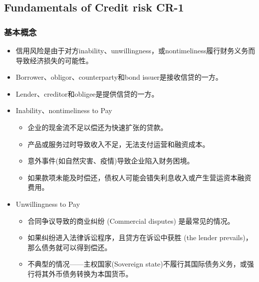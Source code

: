 


\subsection{Fundamentals of Credit risk CR-1}

\subsubsection{基本概念}
\begin{itemize}
\item 信用风险是由于对方inability、unwillingness，或nontimeliness履行财务义务而导致经济损失的可能性。
\item Borrower、obligor、counterparty和bond issuer是接收信贷的一方。
\item Lender、creditor和obligee是提供信贷的一方。
\item Inability、nontimeliness to Pay
    \begin{itemize}
        \item 企业的现金流不足以偿还为快速扩张的贷款。 
        \item 产品或服务过时导致收入不足，无法支付运营和融资成本。
        \item 意外事件(如自然灾害、疫情)导致企业陷入财务困境。
        \item 如果款项未能及时偿还，债权人可能会错失利息收入或产生营运资本融资费用。
    \end{itemize}
\item Unwillingness to Pay
    \begin{itemize}
    \item 合同争议导致的商业纠纷 (Commercial disputes) 是最常见的情况。
    \item 如果纠纷进入法律诉讼程序，且贷方在诉讼中获胜 (the lender prevails)，那么债务就可以得到偿还。
    \item 不典型的情况——主权国家(Sovereign state)不履行其国际债务义务，或强行将其外币债务转换为本国货币。
    \end{itemize}
\end{itemize}

